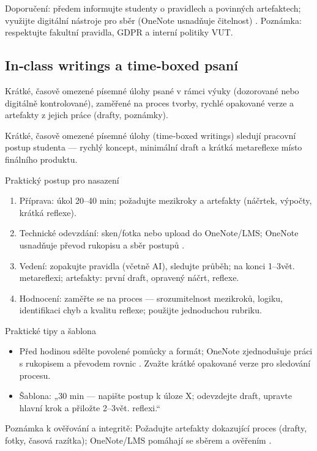 \documentclass{report}%
\begin{document}
Doporučení: předem informujte studenty o pravidlech a povinných artefaktech; využijte digitální nástroje pro sběr (OneNote usnadňuje čitelnost) \cite{kb_ai_101_tipu_pdf_04e4a115_page_8_1}. Poznámka: respektujte fakultní pravidla, GDPR a interní politiky VUT.%

%
\subsection{In‑class writings a time‑boxed psaní}%
Krátké, časově omezené písemné úlohy psané v rámci výuky (dozorované nebo digitálně kontrolované), zaměřené na proces tvorby, rychlé opakované verze a artefakty z jejich práce (drafty, poznámky).%


%
Krátké, časově omezené písemné úlohy (time‑boxed writings) sledují pracovní postup studenta — rychlý koncept, minimální draft a krátká metareflexe místo finálního produktu.

Praktický postup pro nasazení
\begin{enumerate}
\item Příprava: úkol 20–40 min; požadujte mezikroky a artefakty (náčrtek, výpočty, krátká reflexe).
\item Technické odevzdání: sken/fotka nebo upload do OneNote/LMS; OneNote usnadňuje převod rukopisu a sběr postupů \cite{kb_ai_101_tipu_pdf_04e4a115_page_8_1}.
\item Vedení: zopakujte pravidla (včetně AI), sledujte průběh; na konci 1–3vět. metareflexi; artefakty: první draft, opravený náčrt, reflexe.
\item Hodnocení: zaměřte se na proces — srozumitelnost mezikroků, logiku, identifikaci chyb a kvalitu reflexe; použijte jednoduchou rubriku.
\end{enumerate}

Praktické tipy a šablona
\begin{itemize}
\item Před hodinou sdělte povolené pomůcky a formát; OneNote zjednodušuje práci s rukopisem a převodem rovnic \cite{kb_ai_101_tipu_pdf_04e4a115_page_8_1}. Zvažte krátké opakované verze pro sledování procesu.
\item Šablona: „30 min — napište postup k úloze X; odevzdejte draft, upravte hlavní krok a přiložte 2–3vět. reflexi.“
\end{itemize}

Poznámka k ověřování a integritě: Požadujte artefakty dokazující proces (drafty, fotky, časová razítka); OneNote/LMS pomáhají se sběrem a ověřením \cite{kb_ai_101_tipu_pdf_04e4a115_page_8_1}.%
\end{document}
